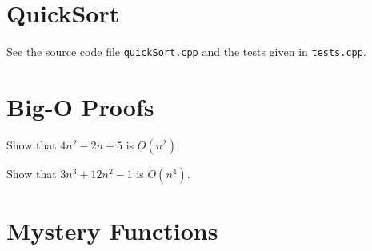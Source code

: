 \documentclass{article}
\begin{document}
    \section{QuickSort}

    See the source code file \texttt{quickSort.cpp} and the tests given in
    \texttt{tests.cpp}.

    \section{Big-O Proofs}

    \vspace{2mm}
     Show that $4n^2−2n+5$ is $O(n^2)$.


    \vspace{1cm}
     Show that $3n^3 + 12n^2 - 1$ is $O(n^4)$.


    \vspace{1cm}
    \section{Mystery Functions}


\end{document}
